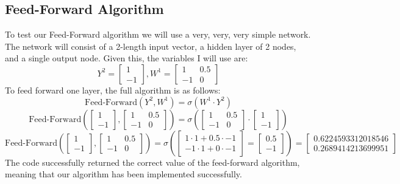 \documentclass[10pt]{article}
\begin{document}
\subsection{Feed-Forward Algorithm}
To test our Feed-Forward algorithm we will use a very, very, very simple network. The network will consist of a 2-length input vector, a hidden layer of 2 nodes, and a single output node. Given this, the variables I will use are:
$$Y^2 = \begin{bmatrix}1 \\ -1\end{bmatrix}, W^1 = \begin{bmatrix}1 & 0.5 \\ -1 & 0\end{bmatrix}$$
To feed forward one layer, the full algorithm is as follows:
$$\text{Feed-Forward}(Y^2,W^1) = \sigma(W^1 \cdot Y^2)$$
$$\text{Feed-Forward}(\begin{bmatrix}1 \\ -1\end{bmatrix},\begin{bmatrix}1 & 0.5 \\ -1 & 0\end{bmatrix}) = \sigma(\begin{bmatrix}1 & 0.5 \\ -1 & 0\end{bmatrix} \cdot \begin{bmatrix}1 \\ -1\end{bmatrix})$$
$$\text{Feed-Forward}(\begin{bmatrix}1 \\ -1\end{bmatrix},\begin{bmatrix}1 & 0.5 \\ -1 & 0\end{bmatrix}) = \sigma(\begin{bmatrix}1 \cdot 1 + 0.5 \cdot -1\\-1 \cdot 1 + 0 \cdot -1\end{bmatrix} = \begin{bmatrix}0.5\\-1\end{bmatrix}) = \begin{bmatrix}0.6224593312018546\\0.2689414213699951\end{bmatrix}$$
The code successfully returned the correct value of the feed-forward algorithm, meaning that our algorithm has been implemented successfully.
\end{document}
